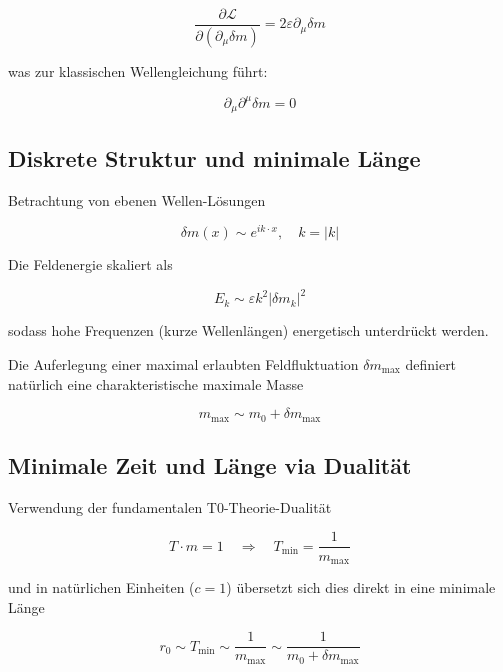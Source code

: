 \documentclass[12pt,a4paper]{article}
\numberwithin{equation}{section}
\begin{document}
	\begin{equation}
		\frac{\partial \mathcal{L}}{\partial (\partial_\mu \delta m)} = 2 \varepsilon \partial_\mu \delta m
	\end{equation}
	
	was zur klassischen Wellengleichung führt:
	
	\begin{equation}
		\partial_\mu \partial^\mu \delta m = 0
	\end{equation}
	
	\subsection{Diskrete Struktur und minimale Länge}
	
	Betrachtung von ebenen Wellen-Lösungen
	
	\begin{equation}
		\delta m(x) \sim e^{i k \cdot x}, \quad k = |k|
	\end{equation}
	
	Die Feldenergie skaliert als
	
	\begin{equation}
		E_k \sim \varepsilon k^2 |\delta m_k|^2
	\end{equation}
	
	sodass hohe Frequenzen (kurze Wellenlängen) energetisch unterdrückt werden.
	
	Die Auferlegung einer maximal erlaubten Feldfluktuation $\delta m_{\mathrm{max}}$ definiert natürlich eine charakteristische maximale Masse
	
	\begin{equation}
		m_{\mathrm{max}} \sim m_0 + \delta m_{\mathrm{max}}
	\end{equation}
	
	\subsection{Minimale Zeit und Länge via Dualität}
	
	Verwendung der fundamentalen T0-Theorie-Dualität
	
	\begin{equation}
		T \cdot m = 1 \quad \Rightarrow \quad T_{\mathrm{min}} = \frac{1}{m_{\mathrm{max}}}
	\end{equation}
	
	und in natürlichen Einheiten ($c = 1$) übersetzt sich dies direkt in eine minimale Länge
	
	\begin{equation}
		r_0 \sim T_{\mathrm{min}} \sim \frac{1}{m_{\mathrm{max}}} \sim \frac{1}{m_0 + \delta m_{\mathrm{max}}}
	\end{equation}
	
\end{document}
